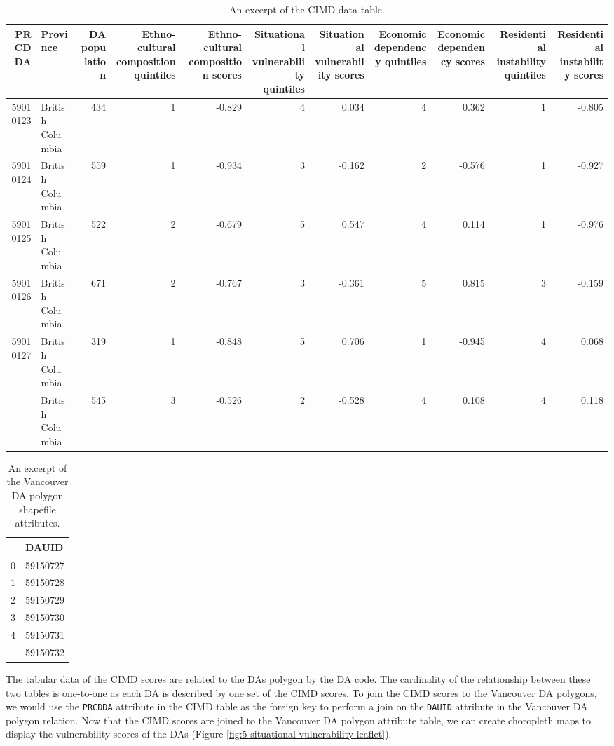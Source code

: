 \documentclass[
]{book}
\begin{document}
\begin{table}

\caption{\label{tab:5-case-join}An excerpt of the CIMD data table.}
\centering
\begin{tabular}[t]{rlrrrrrrrrr}
\toprule
PRCDDA & Province & DA population & Ethno-cultural composition quintiles & Ethno-cultural composition scores & Situational vulnerability quintiles & Situational vulnerability scores & Economic dependency quintiles & Economic dependency scores & Residential instability quintiles & Residential instability scores\\
\midrule
59010123 & British Columbia & 434 & 1 & -0.829 & 4 & 0.034 & 4 & 0.362 & 1 & -0.805\\
59010124 & British Columbia & 559 & 1 & -0.934 & 3 & -0.162 & 2 & -0.576 & 1 & -0.927\\
59010125 & British Columbia & 522 & 2 & -0.679 & 5 & 0.547 & 4 & 0.114 & 1 & -0.976\\
59010126 & British Columbia & 671 & 2 & -0.767 & 3 & -0.361 & 5 & 0.815 & 3 & -0.159\\
59010127 & British Columbia & 319 & 1 & -0.848 & 5 & 0.706 & 1 & -0.945 & 4 & 0.068\\
\addlinespace
59010128 & British Columbia & 545 & 3 & -0.526 & 2 & -0.528 & 4 & 0.108 & 4 & 0.118\\
\bottomrule
\end{tabular}
\end{table}

\begin{table}

\caption{\label{tab:5-case-study-3}An excerpt of the Vancouver DA polygon shapefile attributes.}
\centering
\begin{tabular}[t]{ll}
\toprule
  & DAUID\\
\midrule
0 & 59150727\\
1 & 59150728\\
2 & 59150729\\
3 & 59150730\\
4 & 59150731\\
\addlinespace
5 & 59150732\\
\bottomrule
\end{tabular}
\end{table}

The tabular data of the CIMD scores are related to the DAs polygon by the DA code. The cardinality of the relationship between these two tables is one-to-one as each DA is described by one set of the CIMD scores. To join the CIMD scores to the Vancouver DA polygons, we would use the \texttt{PRCDDA} attribute in the CIMD table as the foreign key to perform a join on the \texttt{DAUID} attribute in the Vancouver DA polygon relation. Now that the CIMD scores are joined to the Vancouver DA polygon attribute table, we can create choropleth maps to display the vulnerability scores of the DAs (Figure \ref{fig:5-situational-vulnerability-leaflet}).
\end{document}
